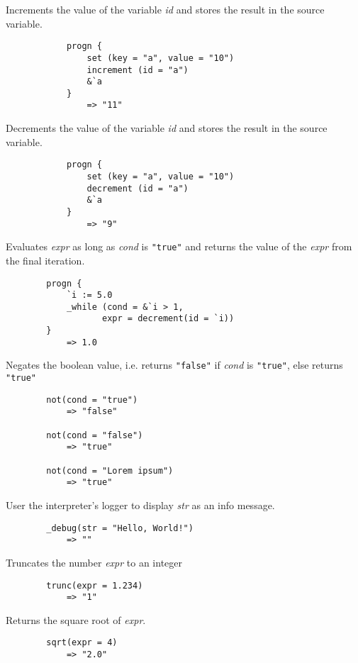 \begin{multicols*}{2}
	Increments the value of the variable \textit{id} and stores the result in the source variable.
	\begin{verbatim}
			progn {
			    set (key = "a", value = "10")
			    increment (id = "a")
			    &`a
			}
			    => "11"
	\end{verbatim}
	Decrements the value of the variable \textit{id} and stores the result in the source variable.
	\begin{verbatim}
			progn {
			    set (key = "a", value = "10")
			    decrement (id = "a")
			    &`a
			}
			    => "9"
	\end{verbatim}
	Evaluates \textit{expr} as long as \textit{cond} is \verb|"true"| and returns the value of the \textit{expr}
	from the final iteration.
	\begin{verbatim}
		progn {
		    `i := 5.0
		    _while (cond = &`i > 1,
		           expr = decrement(id = `i))
		}
		    => 1.0
	\end{verbatim}
	Negates the boolean value, i.e. returns \verb|"false"| if \textit{cond} is \verb|"true"|, else returns \verb|"true"|
	\begin{verbatim}
		not(cond = "true")
		    => "false"

		not(cond = "false")
		    => "true"

		not(cond = "Lorem ipsum")
		    => "true"
	\end{verbatim}
	User the interpreter's logger to display \textit{str} as an info message.
	\begin{verbatim}
		_debug(str = "Hello, World!")
		    => ""
	\end{verbatim}
	Truncates the number \textit{expr} to an integer
	\begin{verbatim}
		trunc(expr = 1.234)
		    => "1"
	\end{verbatim}
	Returns the square root of \textit{expr}.
	\begin{verbatim}
		sqrt(expr = 4)
		    => "2.0"
	\end{verbatim}
\end{multicols*}
\newpage
